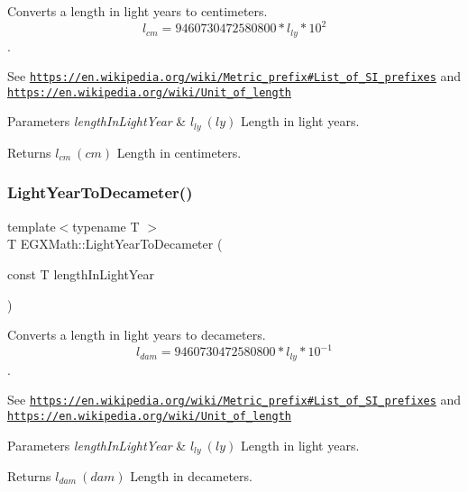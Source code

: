 Converts a length in light years to centimeters. \[ l_{cm}=9460730472580800 * l_{ly} * 10^{2} \]. 

See \href{https://en.wikipedia.org/wiki/Metric_prefix#List_of_SI_prefixes}{\tt https\+://en.\+wikipedia.\+org/wiki/\+Metric\+\_\+prefix\#\+List\+\_\+of\+\_\+\+S\+I\+\_\+prefixes} and \href{https://en.wikipedia.org/wiki/Unit_of_length}{\tt https\+://en.\+wikipedia.\+org/wiki/\+Unit\+\_\+of\+\_\+length} 
\begin{DoxyParams}{Parameters}
{\em length\+In\+Light\+Year} & $ l_{ly}\ (ly)$ Length in light years. \\
\hline
\end{DoxyParams}
\begin{DoxyReturn}{Returns}
$ l_{cm}\ (cm)$ Length in centimeters. 
\end{DoxyReturn}
\mbox{\label{group___e_g_x_math-_conversions-_length_conversions-_astronomical-_light_year-_s_i_gad178f20a1bc896b522fc17f636fbfdc0}} 
\subsubsection{\texorpdfstring{Light\+Year\+To\+Decameter()}{LightYearToDecameter()}}
{\footnotesize\ttfamily template$<$typename T $>$ \\
T E\+G\+X\+Math\+::\+Light\+Year\+To\+Decameter (\begin{DoxyParamCaption}\item[{const T}]{length\+In\+Light\+Year }\end{DoxyParamCaption})}



Converts a length in light years to decameters. \[ l_{dam}=9460730472580800 * l_{ly} * 10^{-1} \]. 

See \href{https://en.wikipedia.org/wiki/Metric_prefix#List_of_SI_prefixes}{\tt https\+://en.\+wikipedia.\+org/wiki/\+Metric\+\_\+prefix\#\+List\+\_\+of\+\_\+\+S\+I\+\_\+prefixes} and \href{https://en.wikipedia.org/wiki/Unit_of_length}{\tt https\+://en.\+wikipedia.\+org/wiki/\+Unit\+\_\+of\+\_\+length} 
\begin{DoxyParams}{Parameters}
{\em length\+In\+Light\+Year} & $ l_{ly}\ (ly)$ Length in light years. \\
\hline
\end{DoxyParams}
\begin{DoxyReturn}{Returns}
$ l_{dam}\ (dam)$ Length in decameters. 
\end{DoxyReturn}
\mbox{\label{group___e_g_x_math-_conversions-_length_conversions-_astronomical-_light_year-_s_i_ga62936f6c3e97506e1c7a818b61ab90c9}} 
